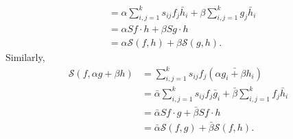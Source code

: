 \documentclass[10.5pt, oneside, a4paper]{article}
\begin{document}
\begin{rmk}
{\begin{align*}
        &= \alpha \sum_{i,j=1}^k s_{ij}f_j\bar{h}_i + \beta \sum_{i,j=1}^k g_j\bar{h}_i\\
        &= \alpha Sf\cdot h + \beta Sg\cdot h\\
        &= \alpha\mathcal{S}(f,h) + \beta\mathcal{S}(g,h).
    \end{align*}
    Similarly,
    \begin{align*}
        \mathcal{S}(f, \alpha g + \beta h)
        &= \sum_{i,j=1}^k s_{ij}f_j(\bar{\alpha g_i + \beta h_i})\\
        &= \bar{\alpha}\sum_{i,j=1}^k s_{ij}f_j\bar{g}_i + \bar{\beta}\sum_{i,j=1}^k f_j \bar{h}_i\\
        &= \bar{\alpha}Sf\cdot g + \bar{\beta}Sf\cdot h\\
        &= \bar{\alpha}\mathcal{S}(f,g) + \bar{\beta}\mathcal{S}(f,h).
    \end{align*}
    }
\end{rmk}
\end{document}
